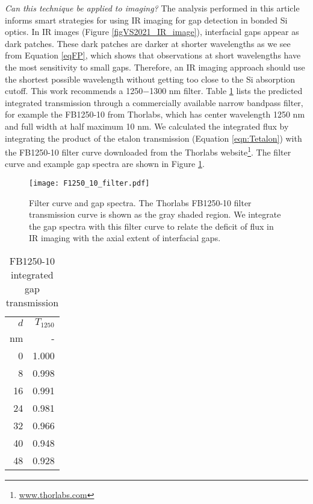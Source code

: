 \documentclass[osajnl,twocolumn,showpacs,superscriptaddress,11pt]{revtex4-1} %
\begin{document}
\emph{Can this technique be applied to imaging?}  The analysis performed in this article informs smart strategies for using IR imaging for gap detection in bonded Si optics.  In IR images (Figure \ref{figVS2021_IR_image}), interfacial gaps appear as dark patches.  These dark patches are darker at shorter wavelengths as we see from Equation \ref{eqFP}, which shows that observations at short wavelengths have the most sensitivity to small gaps.  Therefore, an IR imaging approach should use the shortest possible wavelength without getting too close to the Si absorption cutoff.  This work recommends a 1250$-$1300 nm filter.  Table \ref{tbl_FB1250} lists the predicted integrated transmission through a commercially available narrow bandpass filter, for example the FB1250-10 from Thorlabs, which has center wavelength 1250 nm and full width at half maximum 10 nm.  We calculated the integrated flux by integrating the product of the etalon transmission (Equation \ref{eqn:Tetalon}) with the FB1250-10 filter curve downloaded from the Thorlabs website\footnote{\url{www.thorlabs.com}}.  The filter curve and example gap spectra are shown in Figure \ref{figFB1250-10}.

\begin{figure}[!htbp]
\texttt{[image: F1250\_10\_filter.pdf]}
\caption{\label{figFB1250-10} Filter curve and gap spectra.  The Thorlabs FB1250-10 filter transmission curve is shown as the gray shaded region.  We integrate the gap spectra with this filter curve to relate the deficit of flux in IR imaging with the axial extent of interfacial gaps.}
\end{figure}

\begin{table}[ht]
\caption{FB1250-10 integrated gap transmission \label{tbl_FB1250}}
\begin{center}
    \begin{tabular}{ r r}
    \hline
    $d$ & $T_{1250}$\\
    nm  & - \\
    \hline
      0 &                   1.000 \\
      8 &                   0.998 \\
     16 &                   0.991 \\
     24 &                   0.981 \\
     32 &                   0.966 \\
     40 &                   0.948 \\
     48 &                   0.928 \\
    \hline
    \end{tabular}
\end{center}
\end{table}
\end{document}
